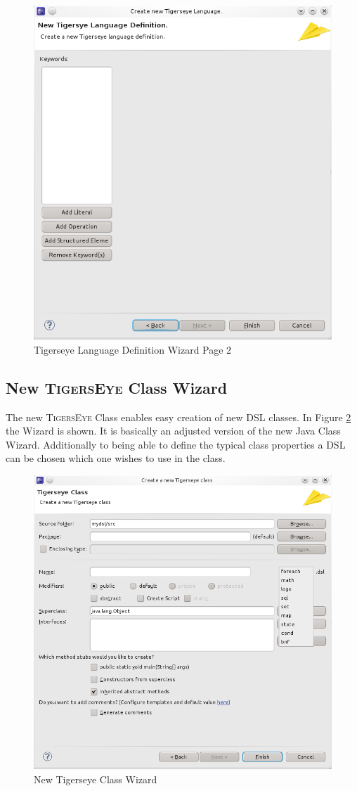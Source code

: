 \documentclass[article,colorback,accentcolor=tud4c]{tudreport}
\newcommand\tiger{%
  \textsc{TigersEye}
}
\begin{document}
	\begin{figure}
	  \centering
	  \includegraphics[width=.5\textwidth,keepaspectratio=true]{./pics/tigerseye_language_definition_page2.png}
	  \caption{Tigerseye Language Definition Wizard Page 2}
	  \label{fig:tiger_lang_definition_page2}
	\end{figure}
	
	\subsection{New \tiger Class Wizard}
	  The new \tiger Class enables easy creation of new DSL classes. In Figure \ref{fig:new_tiger_class_page} the Wizard is shown. It is basically an adjusted version of the new Java Class Wizard. Additionally to being able to define the typical class properties a DSL can be chosen which one wishes to use in the class.

	\begin{figure}
	\centering
	\includegraphics[scale=.5]{./pics/new_tigerseye_class_wizard.png}
	\caption{New Tigerseye Class Wizard}
	\label{fig:new_tiger_class_page}
	\end{figure}	
	
\end{document}
